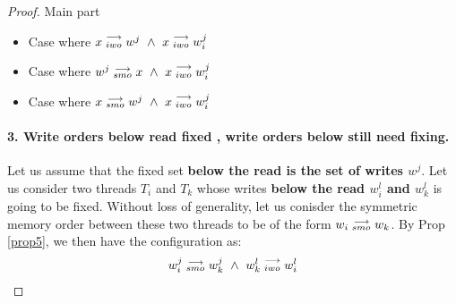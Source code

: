 \begin{proof}{Main part}
\begin{itemize}
                        \begin{itemize}
                            \item Case where $x\stackrel{\longrightarrow}{_{iwo}}w^j \ \wedge \ x\stackrel{\longrightarrow}{_{iwo}}w_i^j$
                            \item Case where $w^j\stackrel{\longrightarrow}{_{smo}}x \ \wedge \ x\stackrel{\longrightarrow}{_{iwo}}w_i^j$
                            \item Case where $x\stackrel{\longrightarrow}{_{smo}}w^j \ \wedge \ x\stackrel{\longrightarrow}{_{iwo}}w_i^j$
                        \end{itemize}

                \end{itemize}

            
            \paragraph{3. Write orders below read fixed , write orders below still need fixing.}
                Let us assume that the fixed set \textbf{below the read is the set of writes $w^j$}. Let us consider two threads $T_i$ and $T_k$ whose writes \textbf{below the read $w_i^l$ and $w_k^l$} is going to be fixed. Without loss of generality, let us conisder the symmetric memory order between these two threads to be of the form $w_i\stackrel{\longrightarrow}{_{smo}}w_k$.  By Prop \ref{prop5}, we then have the configuration as:
                \begin{align*}
                    \reln{w_i^j}{smo}{w_k^j} \ \wedge \ \reln{w_k^l}{iwo}{w_i^l}
                \end{align*}
                

\end{proof}
